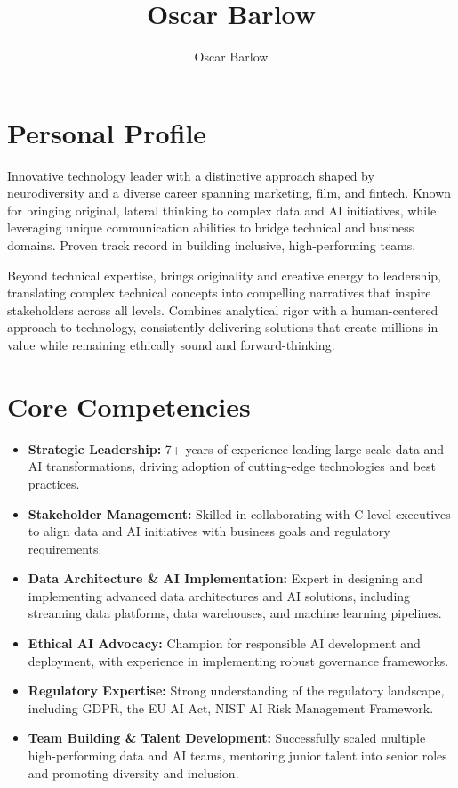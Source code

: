 \documentclass[a4paper]{scrartcl}
\author{Oscar Barlow}
\title{Oscar Barlow}
\date{}
\begin{document}
\maketitle

\section*{Personal Profile}
 { %
  \setlength{\parskip}{6pt plus 2pt minus 1pt}
  Innovative technology leader with a distinctive approach shaped by neurodiversity and a diverse career spanning marketing, film, and fintech. Known for bringing original, lateral thinking to complex data and AI initiatives, while leveraging unique communication abilities to bridge technical and business domains. Proven track record in building inclusive, high-performing teams.

  Beyond technical expertise, brings originality and creative energy to leadership, translating complex technical concepts into compelling narratives that inspire stakeholders across all levels. Combines analytical rigor with a human-centered approach to technology, consistently delivering solutions that create millions in value while remaining ethically sound and forward-thinking.
 } %

\section*{Core Competencies}
\begin{itemize}
	\item \textbf{Strategic Leadership:} 7+ years of experience leading large-scale data and AI transformations, driving adoption of cutting-edge technologies and best practices.
	\item \textbf{Stakeholder Management:} Skilled in collaborating with C-level executives to align data and AI initiatives with business goals and regulatory requirements.
	\item \textbf{Data Architecture \& AI Implementation:} Expert in designing and implementing advanced data architectures and AI solutions, including streaming data platforms, data warehouses, and machine learning pipelines.
	\item \textbf{Ethical AI Advocacy:} Champion for responsible AI development and deployment, with experience in implementing robust governance frameworks.
	\item \textbf{Regulatory Expertise:} Strong understanding of the regulatory landscape, including GDPR, the EU AI Act, NIST AI Risk Management Framework.
	\item \textbf{Team Building \& Talent Development:} Successfully scaled multiple high-performing data and AI teams, mentoring junior talent into senior roles and promoting diversity and inclusion.
\end{itemize}
\end{document}
